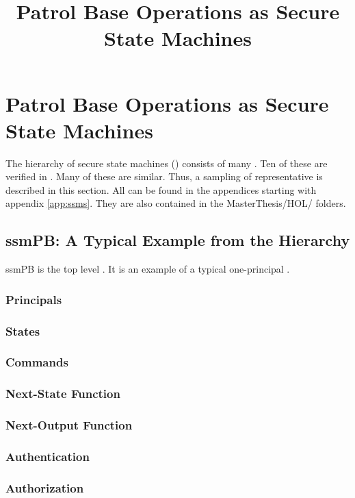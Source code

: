 \documentclass[../../main/main.tex]{subfiles}
\begin{document}
\title{Patrol Base Operations as Secure State Machines}


\chapter{Patrol Base Operations as Secure State Machines} \label{chp:pbssm}
The hierarchy of secure state machines () consists of many .  Ten of these  are verified in .  Many of these  are similar.  Thus, a sampling of representative  is described in this section.  All  can be found in the appendices starting with appendix \ref{app:ssms}.  They are also contained in the MasterThesis/HOL/ folders.

\section{ssmPB: A Typical Example from the Hierarchy}\label{sec:ssmpb}
ssmPB is the top level .  It is an example of a typical one-principal .

\subsection{Principals}
\subsection{States}
\subsection{Commands}
\subsection{Next-State Function}
\subsection{Next-Output Function}
\subsection{Authentication}
\subsection{Authorization}
\end{document}
